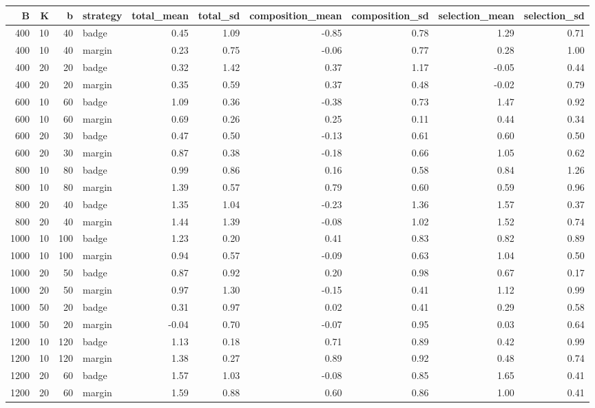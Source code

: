 \begin{tabular}{rrrlrrrrrr}
\toprule
B & K & b & strategy & total_mean & total_sd & composition_mean & composition_sd & selection_mean & selection_sd \\
\midrule
400 & 10 & 40 & badge & 0.45 & 1.09 & -0.85 & 0.78 & 1.29 & 0.71 \\
400 & 10 & 40 & margin & 0.23 & 0.75 & -0.06 & 0.77 & 0.28 & 1.00 \\
400 & 20 & 20 & badge & 0.32 & 1.42 & 0.37 & 1.17 & -0.05 & 0.44 \\
400 & 20 & 20 & margin & 0.35 & 0.59 & 0.37 & 0.48 & -0.02 & 0.79 \\
600 & 10 & 60 & badge & 1.09 & 0.36 & -0.38 & 0.73 & 1.47 & 0.92 \\
600 & 10 & 60 & margin & 0.69 & 0.26 & 0.25 & 0.11 & 0.44 & 0.34 \\
600 & 20 & 30 & badge & 0.47 & 0.50 & -0.13 & 0.61 & 0.60 & 0.50 \\
600 & 20 & 30 & margin & 0.87 & 0.38 & -0.18 & 0.66 & 1.05 & 0.62 \\
800 & 10 & 80 & badge & 0.99 & 0.86 & 0.16 & 0.58 & 0.84 & 1.26 \\
800 & 10 & 80 & margin & 1.39 & 0.57 & 0.79 & 0.60 & 0.59 & 0.96 \\
800 & 20 & 40 & badge & 1.35 & 1.04 & -0.23 & 1.36 & 1.57 & 0.37 \\
800 & 20 & 40 & margin & 1.44 & 1.39 & -0.08 & 1.02 & 1.52 & 0.74 \\
1000 & 10 & 100 & badge & 1.23 & 0.20 & 0.41 & 0.83 & 0.82 & 0.89 \\
1000 & 10 & 100 & margin & 0.94 & 0.57 & -0.09 & 0.63 & 1.04 & 0.50 \\
1000 & 20 & 50 & badge & 0.87 & 0.92 & 0.20 & 0.98 & 0.67 & 0.17 \\
1000 & 20 & 50 & margin & 0.97 & 1.30 & -0.15 & 0.41 & 1.12 & 0.99 \\
1000 & 50 & 20 & badge & 0.31 & 0.97 & 0.02 & 0.41 & 0.29 & 0.58 \\
1000 & 50 & 20 & margin & -0.04 & 0.70 & -0.07 & 0.95 & 0.03 & 0.64 \\
1200 & 10 & 120 & badge & 1.13 & 0.18 & 0.71 & 0.89 & 0.42 & 0.99 \\
1200 & 10 & 120 & margin & 1.38 & 0.27 & 0.89 & 0.92 & 0.48 & 0.74 \\
1200 & 20 & 60 & badge & 1.57 & 1.03 & -0.08 & 0.85 & 1.65 & 0.41 \\
1200 & 20 & 60 & margin & 1.59 & 0.88 & 0.60 & 0.86 & 1.00 & 0.41 \\

\end{tabular}
